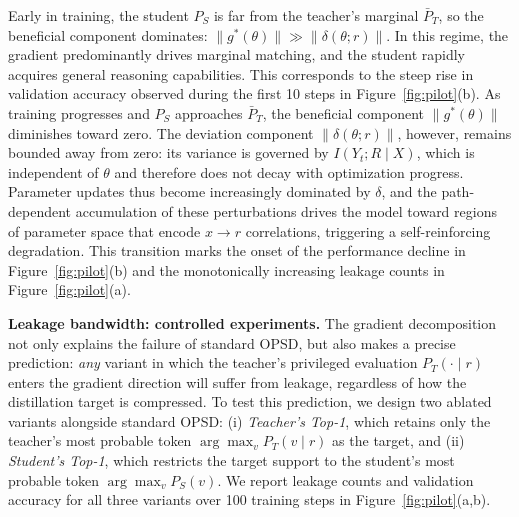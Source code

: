 \documentclass[]{jingdong}
\begin{document}
Early in training, the student $P_S$ is far from the teacher's marginal $\bar{P}_T$, so the beneficial component dominates: $\|g^*(\theta)\| \gg \|\delta(\theta; r)\|$. In this regime, the gradient predominantly drives marginal matching, and the student rapidly acquires general reasoning capabilities. This corresponds to the steep rise in validation accuracy observed during the first 10 steps in Figure~\ref{fig:pilot}(b). As training progresses and $P_S$ approaches $\bar{P}_T$, the beneficial component $\|g^*(\theta)\|$ diminishes toward zero. The deviation component $\|\delta(\theta; r)\|$, however, remains bounded away from zero: its variance is governed by $I(Y_t; R \mid X)$, which is independent of $\theta$ and therefore does not decay with optimization progress. Parameter updates thus become increasingly dominated by $\delta$, and the path-dependent accumulation of these perturbations drives the model toward regions of parameter space that encode $x \to r$ correlations, triggering a self-reinforcing degradation. This transition marks the onset of the performance decline in Figure~\ref{fig:pilot}(b) and the monotonically increasing leakage counts in Figure~\ref{fig:pilot}(a).

\noindent \textbf{Leakage bandwidth: controlled experiments.}
The gradient decomposition not only explains the failure of standard OPSD, but also makes a precise prediction: \textit{any} variant in which the teacher's privileged evaluation $P_T(\cdot \mid r)$ enters the gradient direction will suffer from leakage, regardless of how the distillation target is compressed. To test this prediction, we design two ablated variants alongside standard OPSD: (i) \textit{Teacher's Top-1}, which retains only the teacher's most probable token $\arg\max_v P_T(v \mid r)$ as the target, and (ii) \textit{Student's Top-1}, which restricts the target support to the student's most probable token $\arg\max_v P_S(v)$. We report leakage counts and validation accuracy for all three variants over 100 training steps in Figure~\ref{fig:pilot}(a,b).
\end{document}
